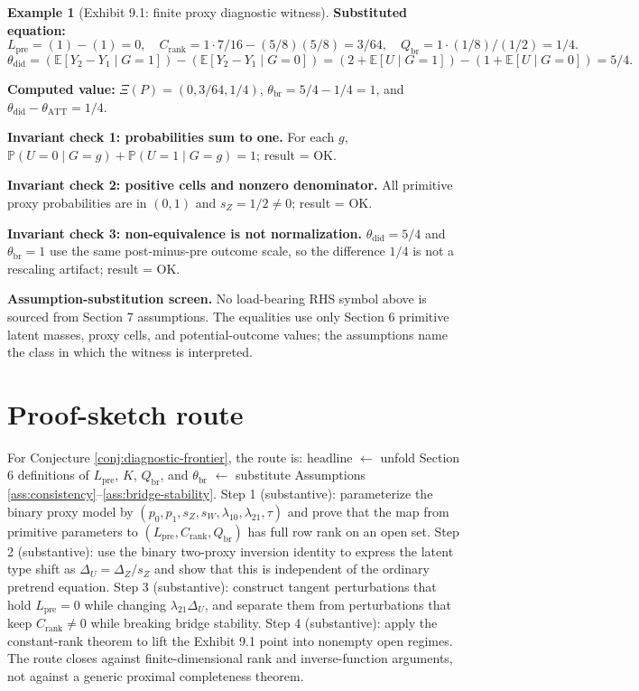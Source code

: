 \documentclass[11pt]{article}
\newcommand{\E}{\mathbb{E}}
\renewcommand{\Pr}{\mathbb{P}}
\theoremstyle{definition}
\newtheorem{example}{Example}
\theoremstyle{plain}
\theoremstyle{remark}
\begin{document}
\begin{example}[Exhibit 9.1: finite proxy diagnostic witness]
\noindent\textbf{Substituted equation:}
\[
L_{\mathrm{pre}}=(1)-(1)=0,\quad
C_{\mathrm{rank}}=1\cdot 7/16-(5/8)(5/8)=3/64,\quad
Q_{\mathrm{br}}=1\cdot(1/8)/(1/2)=1/4 .
\]
\[
\theta_{\mathrm{did}}=(\E[Y_2-Y_1\mid G=1])-(\E[Y_2-Y_1\mid G=0])
=(2+\E[U\mid G=1])-(1+\E[U\mid G=0])=5/4 .
\]

\noindent\textbf{Computed value:}
$\Xi(P)=(0,3/64,1/4)$,
$\theta_{\mathrm{br}}=5/4-1/4=1$, and
$\theta_{\mathrm{did}}-\theta_{\mathrm{ATT}}=1/4$.

\noindent\textbf{Invariant check 1: probabilities sum to one.}
For each $g$, $\Pr(U=0\mid G=g)+\Pr(U=1\mid G=g)=1$; result = OK.

\noindent\textbf{Invariant check 2: positive cells and nonzero denominator.}
All primitive proxy probabilities are in $(0,1)$ and
$s_Z=1/2\ne0$; result = OK.

\noindent\textbf{Invariant check 3: non-equivalence is not normalization.}
$\theta_{\mathrm{did}}=5/4$ and $\theta_{\mathrm{br}}=1$ use the same
post-minus-pre outcome scale, so the difference $1/4$ is not a rescaling
artifact; result = OK.

\noindent\textbf{Assumption-substitution screen.}
No load-bearing RHS symbol above is sourced from Section 7 assumptions. The
equalities use only Section 6 primitive latent masses, proxy cells, and
potential-outcome values; the assumptions name the class in which the witness
is interpreted.
\end{example}

\section{Proof-sketch route}
For Conjecture \ref{conj:diagnostic-frontier}, the route is:
headline $\leftarrow$ unfold Section 6 definitions of
$L_{\mathrm{pre}}$, $K$, $Q_{\mathrm{br}}$, and $\theta_{\mathrm{br}}$
$\leftarrow$ substitute Assumptions \ref{ass:consistency}--\ref{ass:bridge-stability}.
Step 1 (substantive): parameterize the binary proxy model by
$(p_0,p_1,s_Z,s_W,\lambda_{10},\lambda_{21},\tau)$ and prove that the map from
primitive parameters to $(L_{\mathrm{pre}},C_{\mathrm{rank}},Q_{\mathrm{br}})$
has full row rank on an open set. Step 2 (substantive): use the binary
two-proxy inversion identity to express the latent type shift as
$\Delta_U=\Delta_Z/s_Z$ and show that this is independent of the ordinary
pretrend equation. Step 3 (substantive): construct tangent perturbations that
hold $L_{\mathrm{pre}}=0$ while changing $\lambda_{21}\Delta_U$, and separate
them from perturbations that keep $C_{\mathrm{rank}}\ne0$ while breaking bridge
stability. Step 4 (substantive): apply the constant-rank theorem to lift the
Exhibit 9.1 point into nonempty open regimes. The route closes against
finite-dimensional rank and inverse-function arguments, not against a generic
proximal completeness theorem.
\end{document}
